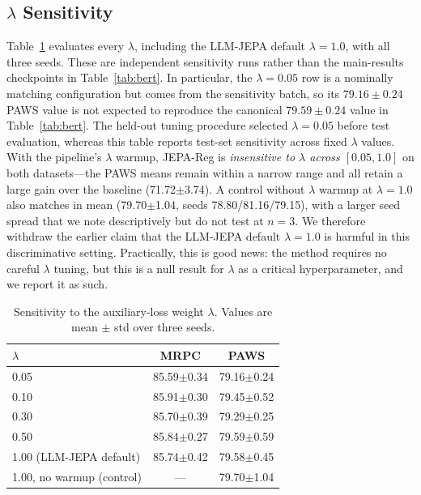 \documentclass[sigconf]{acmart}
\begin{document}
\subsection{$\lambda$ Sensitivity}
\label{sec:lambda}
Table~\ref{tab:lambda} evaluates every $\lambda$, including the LLM-JEPA default $\lambda=1.0$, with all three seeds. These are independent sensitivity runs rather than the main-results checkpoints in Table~\ref{tab:bert}. In particular, the $\lambda=0.05$ row is a nominally matching configuration but comes from the sensitivity batch, so its $79.16\pm0.24$ PAWS value is not expected to reproduce the canonical $79.59\pm0.24$ value in Table~\ref{tab:bert}. The held-out tuning procedure selected $\lambda=0.05$ before test evaluation, whereas this table reports test-set sensitivity across fixed $\lambda$ values. With the pipeline's $\lambda$ warmup, JEPA-Reg is \emph{insensitive to $\lambda$ across $[0.05, 1.0]$} on both datasets---the PAWS means remain within a narrow range and all retain a large gain over the baseline (71.72$\pm$3.74). A control without $\lambda$ warmup at $\lambda=1.0$ also matches in mean (79.70$\pm$1.04, seeds 78.80/81.16/79.15), with a larger seed spread that we note descriptively but do not test at $n=3$. We therefore withdraw the earlier claim that the LLM-JEPA default $\lambda=1.0$ is harmful in this discriminative setting. Practically, this is good news: the method requires no careful $\lambda$ tuning, but this is a null result for $\lambda$ as a critical hyperparameter, and we report it as such.

\begin{table}[!htbp]
\caption{Sensitivity to the auxiliary-loss weight $\lambda$. Values are mean $\pm$ std over three seeds.}
\label{tab:lambda}
\begin{tabular}{lcc}
\toprule
$\lambda$ & MRPC & PAWS \\
\midrule
0.05 & 85.59$\pm$0.34 & 79.16$\pm$0.24 \\
0.10 & 85.91$\pm$0.30 & 79.45$\pm$0.52 \\
0.30 & 85.70$\pm$0.39 & 79.29$\pm$0.25 \\
0.50 & 85.84$\pm$0.27 & 79.59$\pm$0.59 \\
1.00 (LLM-JEPA default) & 85.74$\pm$0.42 & 79.58$\pm$0.45 \\
1.00, no warmup (control) & --- & 79.70$\pm$1.04 \\
\bottomrule
\end{tabular}
\end{table}
\end{document}
